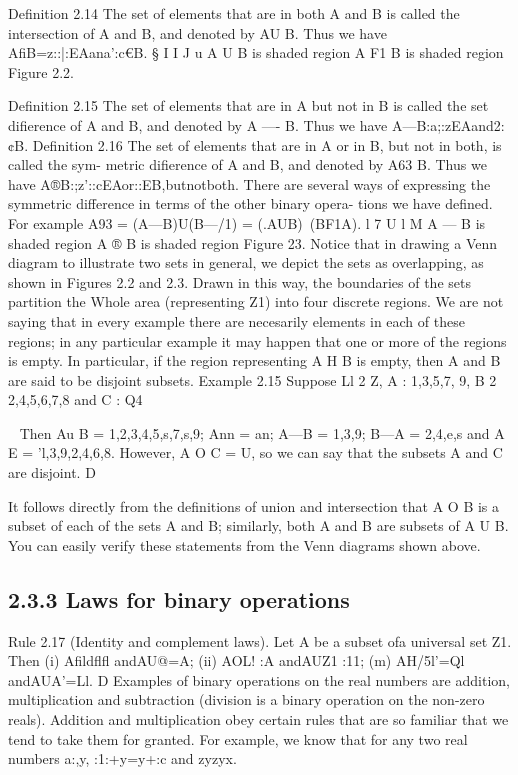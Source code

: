 {{{Deﬁnition 2.14 The set of elements that are in both A and B is called the intersection of A
and B, and denoted by AU B. Thus we have
AﬁB={z::|:EAana':c€B}.
§
I  I J u
A U B is shaded region A F1 B is shaded region
Figure 2.2.


Deﬁnition 2.15 The set of elements that are in A but not in B is called the set diﬁerence of
A and B, and denoted by A —- B. Thus we have
A—B:{a;:zEAand2:¢B}.
Deﬁnition 2.16 The set of elements that are in A or in B, but not in both, is called the sym-
metric diﬁerence of A and B, and denoted by A63 B. Thus we have
A®B:{;z'::cEAor::EB,butnotboth}.
There are several ways of expressing the symmetric difference in terms of the other binary opera-
tions we have deﬁned. For example
A93 = (A—B)U(B—/1)
= (.AUB)~(BF1A).
l 7 U l   M
A — B is shaded region A ® B is shaded region
Figure 23.
Notice that in drawing a Venn diagram to illustrate two sets in general, we depict the sets as
overlapping, as shown in Figures 2.2 and 2.3. Drawn in this way, the boundaries of the sets
partition the Whole area (representing Z1) into four discrete regions. We are not saying that in
every example there are necesarily elements in each of these regions; in any particular example
it may happen that one or more of the regions is empty. In particular, if the region representing
A H B is empty, then A and B are said to be disjoint subsets.
Example 2.15 Suppose Ll 2 Z, A : {1,3,5,7, 9}, B 2 {2,4,5,6,7,8} and C : {Q}4}~ Then
Au B = {1,2,3,4,5,s,7,s,9}; Ann = {an}; A—B = {1,3,9}; B—A = {2,4,e,s} and
A  E = {'l,3,9,2,4,6,8}. However, A O C = U, so we can say that the subsets A and C are
disjoint. D

It follows directly from the deﬁnitions of union and intersection that A O B is a subset of each
of the sets A and B; similarly, both A and B are subsets of A U B. You can easily verify these
statements from the Venn diagrams shown above.

\subsection{2.3.3 Laws for binary operations}
Rule 2.17 (Identity and complement laws). Let A be a subset ofa universal set Z1. Then
(i) Aﬁldflﬂ andAU@=A;
(ii) AOL! :A andAUZ1 :11;
(m) AH/5l'=Ql andAUA’=Ll. D
Examples of binary operations on the real numbers are addition, multiplication and subtraction
(division is a binary operation on the non-zero reals). Addition and multiplication obey certain
rules that are so familiar that we tend to take them for granted. For example, we know that for
any two real numbers a:,y,
:1:+y=y+:c and zyzyx.


}}
